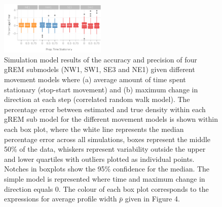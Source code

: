 \begin{knitrout}\footnotesize
{}\color{fgcolor}\begin{kframe}


{\ttfamily\noindent\bfseries\color{errorcolor}{\#\# Error in grid.Call(L\_textBounds, as.graphicsAnnot(x\$label), x\$x, x\$y, : failed to find or load PDF CID font}}\end{kframe}\begin{figure}[t]

{\centering \includegraphics[width=0.45\textwidth]{figure/movtFig-1} 

}

\caption[Simulation model results of the accuracy and precision of four gREM submodels]{
Simulation model results of the accuracy and precision of four gREM submodels (NW1, SW1, SE3 and NE1) given different movement models where (a) average amount of time spent stationary (stop-start movement) and (b) maximum change in direction at each step (correlated random walk model).
The percentage error between estimated and true density within each gREM sub model for the different movement models is shown within each box plot, where the white line represents the median percentage error across all simulations, boxes represent the middle 50\% of the data, whiskers represent variability outside the upper and lower quartiles with outliers plotted as individual points.
Notches in boxplots show the 95\% confidence for the median.
The simple model is represented where time and maximum change in direction equals 0.
The colour of each box plot corresponds to the expressions for average profile width $\bar{p}$ given in Figure 4.
}\label{fig:movtFig}
\end{figure}


\end{knitrout}

